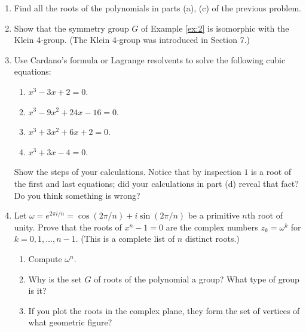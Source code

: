 \documentclass[11pt]{article}
\newenvironment{problems}
{
 \begin{enumerate}[topsep=1pt,itemsep=0pt,parsep=2pt,leftmargin=0.6cm,%
 label={\arabic*.}, ref=\arabic*] \small
}
{
 \end{enumerate}
}
\theoremstyle{definition}
\begin{document}
\begin{problems}
\item Find all the roots of the polynomials in parts (a), (c) of the
  previous problem.

\item Show that the symmetry group $G$ of Example \ref{ex:2} is
  isomorphic with the Klein 4-group. (The Klein 4-group was introduced
  in Section 7.)

\item Use Cardano's formula or Lagrange resolvents to solve the
  following cubic equations:
  \begin{enumerate}
  \item $x^3 - 3x + 2 = 0$. 
  \item $x^3 - 9x^2 + 24x - 16 = 0$.
  \item $x^3 + 3x^2 + 6x + 2 = 0$.
  \item $x^3 + 3 x - 4 = 0$. 
  \end{enumerate}
Show the steps of your calculations. Notice that by inspection $1$ is
a root of the first and last equations; did your calculations in part
(d) reveal that fact? Do you think something is wrong?


\item Let $\omega = e^{2\pi i/n} = \cos(2\pi/n) + i \sin(2\pi/n)$ be a
  primitive $n$th root of unity. Prove that the roots of $x^n - 1 = 0$
  are the complex numbers $z_k = \omega^k$ for $k = 0, 1, \dots,
  n-1$. (This is a complete list of $n$ distinct roots.) 
  \begin{enumerate}
  \item Compute $\omega^n$.
  \item Why is the set $G$ of roots of the polynomial a group? What type
    of group is it?
  \item If you plot the roots in the complex plane, they form the set
    of vertices of what geometric figure?
  \end{enumerate}

\end{problems}
\renewcommand{\thesection}{\arabic{section}}
\end{document}
